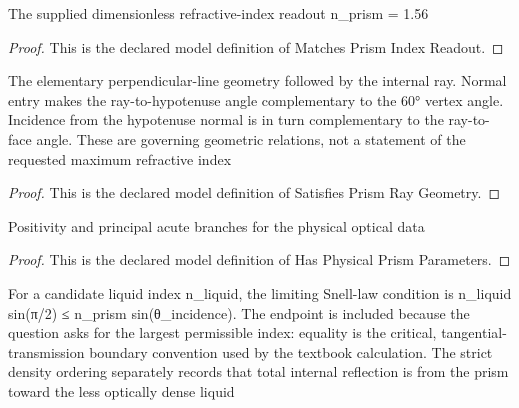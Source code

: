 \begin{definition}
  \label{def:physics:phyx-mini-0100:phyxminiproblems-problemphyxmini0100-matchesprismindexreadout}
  The supplied dimensionless refractive-index readout n\_prism = 1.56
\end{definition}
\begin{proof}
  This is the declared model definition of Matches Prism Index Readout.
\end{proof}
\begin{definition}
  \label{def:physics:phyx-mini-0100:phyxminiproblems-problemphyxmini0100-satisfiesprismraygeometry}
  The elementary perpendicular-line geometry followed by the internal ray. Normal entry makes the ray-to-hypotenuse angle complementary to the 60° vertex angle. Incidence from the hypotenuse normal is in turn complementary to the ray-to-face angle. These are governing geometric relations, not a statement of the requested maximum refractive index
\end{definition}
\begin{proof}
  This is the declared model definition of Satisfies Prism Ray Geometry.
\end{proof}
\begin{definition}
  \label{def:physics:phyx-mini-0100:phyxminiproblems-problemphyxmini0100-hasphysicalprismparameters}
  Positivity and principal acute branches for the physical optical data
\end{definition}
\begin{proof}
  This is the declared model definition of Has Physical Prism Parameters.
\end{proof}
\begin{definition}
  \label{def:physics:phyx-mini-0100:phyxminiproblems-problemphyxmini0100-permitstotalinternalreflection}
  For a candidate liquid index n\_liquid, the limiting Snell-law condition is n\_liquid sin(π/2) ≤ n\_prism sin(θ\_incidence). The endpoint is included because the question asks for the largest permissible index: equality is the critical, tangential-transmission boundary convention used by the textbook calculation. The strict density ordering separately records that total internal reflection is from the prism toward the less optically dense liquid
\end{definition}
